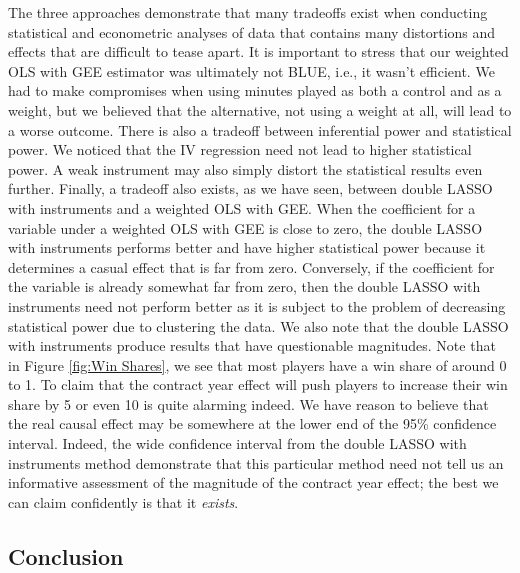 \documentclass[12pt]{article}
\begin{document}
	The three approaches demonstrate that many tradeoffs exist when conducting statistical and econometric analyses of data that contains many distortions and effects that are difficult to tease apart. It is important to stress that our weighted OLS with GEE estimator was ultimately not BLUE, i.e., it wasn't efficient. We had to make compromises when using minutes played as both a control and as a weight, but we believed that the alternative, not using a weight at all, will lead to a worse outcome. There is also a tradeoff between inferential power and statistical power. We noticed that the IV regression need not lead to higher statistical power. A weak instrument may also simply distort the statistical results even further. Finally, a tradeoff also exists, as we have seen, between double LASSO with instruments and a weighted OLS with GEE. When the coefficient for a variable under a weighted OLS with GEE is close to zero, the double LASSO with instruments performs better and have higher statistical power because it determines a casual effect that is far from zero. Conversely, if the coefficient for the variable is already somewhat far from zero, then the double LASSO with instruments need not perform better as it is subject to the problem of decreasing statistical power due to clustering the data. We also note that the double LASSO with instruments produce results that have questionable magnitudes. Note that in Figure \ref{fig:Win Shares}, we see that most players have a win share of around 0 to 1. To claim that the contract year effect will push players to increase their win share by 5 or even 10 is quite alarming indeed. We have reason to believe that the real causal effect may be somewhere at the lower end of the 95\% confidence interval. Indeed, the wide confidence interval from the double LASSO with instruments method demonstrate that this particular method need not tell us an informative assessment of the magnitude of the contract year effect; the best we can claim confidently is that it \emph{exists}.
	
	\subsection{Conclusion}
	
\end{document}
